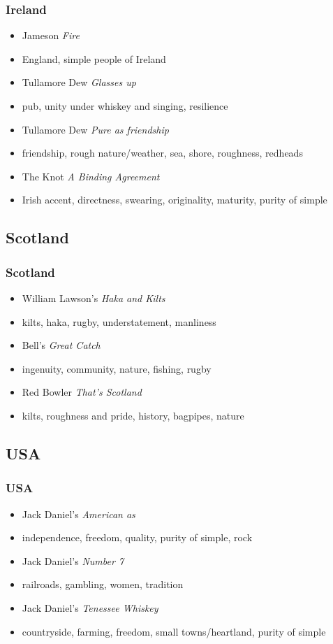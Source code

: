 \documentclass{beamer}
\begin{document}
\begin{frame}
 \frametitle{Ireland}
 \begin{itemize}
  \item <1-> Jameson \emph{Fire}
  \item <2-> England, simple people of Ireland
  \item<3-> Tullamore Dew \emph{Glasses up}
  \item<4-> pub, unity under whiskey and singing, resilience
  \item<5-> Tullamore Dew \emph{Pure as friendship}
  \item<6-> friendship, rough nature/weather, sea, shore, roughness, redheads
  \item<7-> The Knot \emph{A Binding Agreement}
  \item<8> Irish accent, directness, swearing, originality, maturity, purity of simple
\end{itemize}
\end{frame}

\subsection{Scotland}

\begin{frame}
 \frametitle{Scotland}
 \begin{itemize}
  \item<1-> William Lawson's \emph{Haka and Kilts}
  \item<2-> kilts, haka, rugby, understatement, manliness
  \item<3-> Bell's \emph{Great Catch}
  \item<4-> ingenuity, community, nature, fishing, rugby
  \item<5-> Red Bowler \emph{That's Scotland}
  \item<6> kilts, roughness and pride, history, bagpipes, nature
 \end{itemize}
\end{frame}

\subsection{USA}

\begin{frame}
 \frametitle{USA}
 \begin{itemize}
  \item<1-> Jack Daniel's \emph{American as}
  \item<2-> independence, freedom, quality, purity of simple, rock
  \item<3-> Jack Daniel's \emph{Number 7}
  \item<4-> railroads, gambling, women, tradition
  \item<5-> Jack Daniel's \emph{Tenessee Whiskey}
  \item<6-> countryside, farming, freedom, small towns/heartland, purity of simple
 \end{itemize}
\end{frame}
\end{document}
